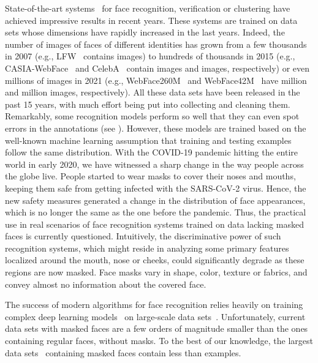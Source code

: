 \documentclass{article}
\begin{document}
State-of-the-art systems~\cite{Schroff15CVPR,Deng19CVPR,Parkhi15BMVC,Liu2017CVPR} for face recognition, verification or clustering have achieved impressive results in recent years. These systems are trained on data sets whose dimensions have rapidly increased in the last years. Indeed, the number of images of faces of different identities has grown from a few thousands in 2007 (e.g., LFW~\cite{Huang07Tech} contains  images) to hundreds of thousands in 2015 (e.g., CASIA-WebFace~\cite{yi2014learning} and CelebA~\cite{Liu2015ICCV} contain  images and  images, respectively) or even millions of images in 2021 (e.g., WebFace260M~\cite{Zhu2021CVPR} and WebFace42M~\cite{Zhu2021CVPR} have  million and  million images, respectively). All these data sets have been released in the past 15 years, with much effort being put into collecting and cleaning them. Remarkably, some recognition models perform so well that they can even spot errors in the annotations (see \cite{Schroff15CVPR}). However, these models are trained based on the well-known machine learning assumption that training and testing examples follow the same distribution. With the COVID-19 pandemic hitting the entire world in early 2020, we have witnessed a sharp change in the way people across the globe live. People started to wear masks to cover their noses and mouths, keeping them safe from getting infected with the SARS-CoV-2 virus. Hence, the new safety measures generated a change in the distribution of face appearances, which is no longer the same as the one before the pandemic. Thus, the practical use in real scenarios of face recognition systems trained on data lacking masked faces is currently questioned. Intuitively, the discriminative power of such recognition systems, which might reside in analyzing some primary features localized around the mouth, nose or cheeks, could significantly degrade as these regions are now masked. Face masks vary in shape, color, texture or fabrics, and convey almost no information about the covered face.

The success of modern algorithms for face recognition relies heavily on training complex deep learning models~\cite{Schroff15CVPR,Deng19CVPR,Liu2017CVPR} on large-scale data sets~\cite{Liu2017CVPR,yi2014learning,Liu2015ICCV}. Unfortunately, current data sets \cite{wang2020arxiv,anwar2020arxiv,deng2021arxiv,zhu2021arxiv} with masked faces are a few orders of magnitude smaller than the ones containing regular faces, without masks. To the best of our knowledge, the largest data sets~\cite{wang2020arxiv,deng2021arxiv} containing masked faces contain less than  examples. 
\end{document}
